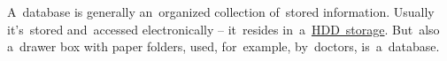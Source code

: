 \label{databases}
\todo A~database is generally an~organized collection of~stored information.
Usually it's~stored and~accessed electronically -- it~resides in~a~\hyperref[harddiskdrive]{HDD~storage}.
But~also a~drawer box with paper folders, used, for~example, by~doctors, is~a~database.

